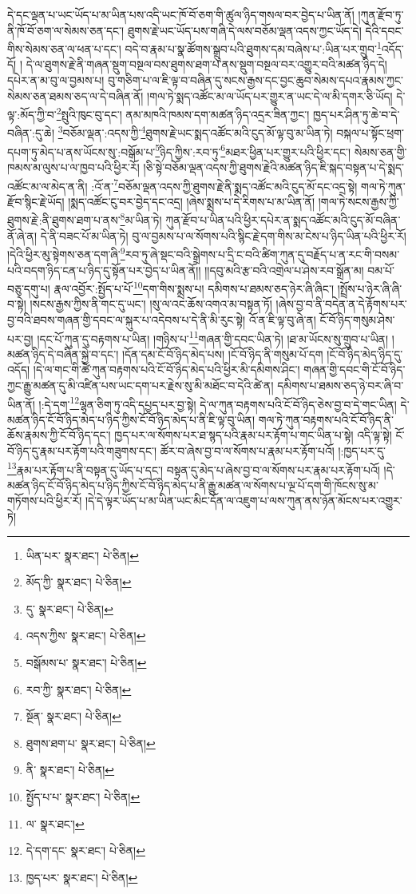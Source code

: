 དེ་དང་ལྡན་པ་ཡང་ཡོད་པ་མ་ཡིན་པས་འདི་ཡང་ཁོ་བོ་ཅག་གི་ཚུལ་ཉིད་གསལ་བར་བྱེད་པ་ཡིན་ནོ། །ཀུན་རྫོབ་ཏུ་ནི་ཁོ་བོ་ཅག་ལ་སེམས་ཅན་དང་། ཐུགས་རྗེ་ཡང་ཡོད་པས་གཞི་དེ་ལས་བཅོམ་ལྡན་འདས་ཀྱང་ཡོད་དེ། དེའི་དབང་གིས་སེམས་ཅན་ལ་ཕན་པ་དང་། བདེ་བ་རྣམ་པ་སྣ་ཚོགས་སྒྲུབ་པའི་ཐུགས་དམ་བཞེས་པ་:ཡིན་པར་གྲུབ་\footnote{ཡིན་པར་  སྣར་ཐང་།  པེ་ཅིན། }འདོད་དོ། །
དེ་ལ་ཐུགས་རྗེ་ནི་གཞན་སྡུག་བསྔལ་བས་ཐུགས་ཐག་པ་ནས་སྡུག་བསྔལ་བར་འགྱུར་བའི་མཚན་ཉིད་དེ། དཔེར་ན་མ་བུ་ལ་བྱམས་པ། བུ་གཅིག་པ་ལ་ཇི་ལྟ་བ་བཞིན་དུ་སངས་རྒྱས་དང་བྱང་ཆུབ་སེམས་དཔའ་རྣམས་ཀྱང་སེམས་ཅན་ཐམས་ཅད་ལ་དེ་བཞིན་ནོ། །གལ་ཏེ་སྨད་འཚོང་མ་ལ་ཡོད་པར་གྱུར་ན་ཡང་དེ་ལ་མི་དགར་ཅི་ཡོད། དེ་ལྟ་:མོད་ཀྱི་བ་\footnote{མོད་ཀྱི་  སྣར་ཐང་།  པེ་ཅིན། }སྤུའི་ཁུང་བུ་དང་། ནམ་མཁའི་ཁམས་དག་མཚན་ཉིད་འདྲར་ཟིན་ཀྱང་། ཁྱད་པར་ཤིན་ཏུ་ཆེ་བ་དེ་བཞིན་:དུ་ཆེ། \footnote{དུ་  སྣར་ཐང་།  པེ་ཅིན། }བཅོམ་ལྡན་:འདས་ཀྱི་\footnote{འདས་ཀྱིས་  སྣར་ཐང་།  པེ་ཅིན། }ཐུགས་རྗེ་ཡང་སྨད་འཚོང་མའི་ངུད་མོ་ལྟ་བུ་མ་ཡིན་ཏེ། བསྐལ་པ་སྟོང་ཕྲག་དཔག་ཏུ་མེད་པ་ནས་ཡོངས་སུ་:བསྒོམ་པ་\footnote{བསྒོམས་པ་  སྣར་ཐང་།  པེ་ཅིན། }ཉིད་ཀྱིས་:རབ་ཏུ་\footnote{རབ་ཀྱི་  སྣར་ཐང་།  པེ་ཅིན། }མཐར་ཕྱིན་པར་གྱུར་པའི་ཕྱིར་དང་། སེམས་ཅན་གྱི་ཁམས་མ་ལུས་པ་ལ་ཁྱབ་པའི་ཕྱིར་རོ། །ཅི་སྟེ་བཅོམ་ལྡན་འདས་ཀྱི་ཐུགས་རྗེའི་མཚན་ཉིད་ཇི་སྐད་བསྟན་པ་དེ་སྨད་འཚོང་མ་ལ་མེད་ན་ནི། :འོ་ན་\footnote{སྔོན་  སྣར་ཐང་།  པེ་ཅིན། }བཅོམ་ལྡན་འདས་ཀྱི་ཐུགས་རྗེ་ནི་སྨད་འཚོང་མའི་ངུད་མོ་དང་འདྲ་སྟེ། གལ་ཏེ་ཀུན་རྫོབ་སྙིང་རྗེ་ཡོད། །སྨད་འཚོང་ངུ་བར་བྱེད་དང་འདྲ། །ཞེས་སྨྲས་པ་དེ་རིགས་པ་མ་ཡིན་ནོ། །གལ་ཏེ་སངས་རྒྱས་ཀྱི་ཐུགས་རྗེ་:ནི་ཐུགས་ཐག་པ་ནས་\footnote{ཐུགས་ཐག་པ་  སྣར་ཐང་།  པེ་ཅིན། }མ་ཡིན་ཏེ། ཀུན་རྫོབ་པ་ཡིན་པའི་ཕྱིར་དཔེར་ན་སྨད་འཚོང་མའི་ངུད་མོ་བཞིན་ནོ་ཞེ་ན། དེ་ནི་བཟང་པོ་མ་ཡིན་ཏེ། བུ་ལ་བྱམས་པ་ལ་སོགས་པའི་སྙིང་རྗེ་དག་གིས་མ་ངེས་པ་ཉིད་ཡིན་པའི་ཕྱིར་རོ། །དེའི་ཕྱིར་མུ་སྟེགས་ཅན་དག་ཞི་\footnote{ནི་  སྣར་ཐང་།  པེ་ཅིན། }རབ་ཏུ་ཞེ་སྡང་བའི་སྒྲེགས་པ་དྲི་ང་བའི་ཚིག་ཀུན་དུ་བརྗོད་པ་ན་རང་གི་བསམ་པའི་བདག་ཉིད་ངན་པ་ཉིད་དུ་སྟོན་པར་བྱེད་པ་ཡིན་ནོ།། །།དབུ་མའི་རྩ་བའི་འགྲེལ་པ་ཤེས་རབ་སྒྲོན་མ། བམ་པོ་བཅུ་དགུ་པ། རྣལ་འབྱོར་:སྤྱོད་པ་པོ་\footnote{སྤྱོད་པ་པ་  སྣར་ཐང་།  པེ་ཅིན། }དག་གིས་སྨྲས་པ། དམིགས་པ་ཐམས་ཅད་ཉེར་ཞི་ཞིང་། །སྤྲོས་པ་ཉེར་ཞི་ཞི་བ་སྟེ། །སངས་རྒྱས་ཀྱིས་ནི་གང་དུ་ཡང་། །སུ་ལ་འང་ཆོས་འགའ་མ་བསྟན་ཏོ། །ཞེས་བྱ་བ་ནི་བདེན་ན་དེ་རྟོགས་པར་བྱ་བའི་ཐབས་གཞན་གྱི་དབང་ལ་སྐུར་པ་འདེབས་པ་དེ་ནི་མི་རུང་སྟེ། འོ་ན་ཇི་ལྟ་བུ་ཞེ་ན། ངོ་བོ་ཉིད་གསུམ་ཤེས་པར་བྱ། །དང་པོ་ཀུན་དུ་བརྟགས་པ་ཡིན། །གཉིས་པ་\footnote{ལ་  སྣར་ཐང་། }གཞན་གྱི་དབང་ཡིན་ཏེ། །ཐ་མ་ཡོངས་སུ་གྲུབ་པ་ཡིན། །མཚན་ཉིད་དེ་བཞིན་སྐྱེ་བ་དང་། །དོན་དམ་ངོ་བོ་ཉིད་མེད་པས། །ངོ་བོ་ཉིད་ནི་གསུམ་པོ་དག །ངོ་བོ་ཉིད་མེད་ཉིད་དུ་འདོད། །དེ་ལ་གང་གི་ཚེ་ཀུན་བརྟགས་པའི་ངོ་བོ་ཉིད་མེད་པའི་ཕྱིར་མི་དམིགས་ཤིང་། གཞན་གྱི་དབང་གི་ངོ་བོ་ཉིད་ཀྱང་རྒྱུ་མཚན་དུ་མི་འཛིན་པས་ཡང་དག་པར་རྗེས་སུ་མི་མཐོང་བ་དེའི་ཚེ་ན། དམིགས་པ་ཐམས་ཅད་ཉེ་བར་ཞི་བ་ཡིན་ནོ། །:དེ་དག་\footnote{དེ་དག་དང་  སྣར་ཐང་།  པེ་ཅིན། }ལྷན་ཅིག་ཏུ་འདི་དཔྱད་པར་བྱ་སྟེ། དེ་ལ་ཀུན་བརྟགས་པའི་ངོ་བོ་ཉིད་ཅེས་བྱ་བ་དེ་གང་ཡིན། དེ་མཚན་ཉིད་ངོ་བོ་ཉིད་མེད་པ་ཉིད་ཀྱིས་ངོ་བོ་ཉིད་མེད་པ་ནི་ཇི་ལྟ་བུ་ཡིན། གལ་ཏེ་ཀུན་བརྟགས་པའི་ངོ་བོ་ཉིད་ནི་ཆོས་རྣམས་ཀྱི་ངོ་བོ་ཉིད་དང་། ཁྱད་པར་ལ་སོགས་པར་ཐ་སྙད་པའི་རྣམ་པར་རྟོག་པ་གང་ཡིན་པ་སྟེ། འདི་ལྟ་སྟེ། ངོ་བོ་ཉིད་དུ་རྣམ་པར་རྟོག་པའི་གཟུགས་དང་། ཚོར་བ་ཞེས་བྱ་བ་ལ་སོགས་པ་རྣམ་པར་རྟོག་པའོ། །:ཁྱད་པར་དུ་\footnote{ཁྱད་པར་  སྣར་ཐང་།  པེ་ཅིན། }རྣམ་པར་རྟོག་པ་ནི་བསྟན་དུ་ཡོད་པ་དང་། བསྟན་དུ་མེད་པ་ཞེས་བྱ་བ་ལ་སོགས་པར་རྣམ་པར་རྟོག་པའོ། །དེ་མཚན་ཉིད་ངོ་བོ་ཉིད་མེད་པ་ཉིད་ཀྱིས་ངོ་བོ་ཉིད་མེད་པ་ནི་རྒྱུ་མཚན་ལ་སོགས་པ་ལྔ་པོ་དག་གི་ཁོངས་སུ་མ་གཏོགས་པའི་ཕྱིར་རོ། །དེ་དེ་ལྟར་ཡོད་པ་མ་ཡིན་ཡང་མིང་དོན་ལ་འཇུག་པ་ལས་ཀུན་ནས་ཉོན་མོངས་པར་འགྱུར་ཏེ། 